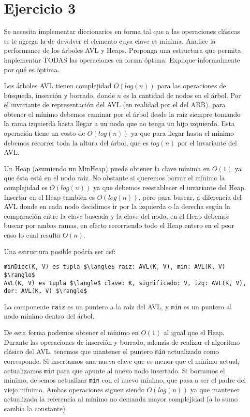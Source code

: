 \section*{Ejercicio 3}

Se necesita implementar diccionarios en forma tal que a las operaciones clásicas se le agrega la de devolver el elemento cuya clave es mínima. Analice la performance de los árboles AVL y Heaps. Proponga una estructura que permita implementar TODAS las operaciones en forma óptima. Explique informalmente por qué es óptima.

Los árboles AVL tienen complejidad $O(log(n))$ para las operaciones de búsqueda, inserción y borrado, donde $n$ es la cantidad de nodos en el árbol. Por el invariante de representación del AVL (en realidad por el del ABB), para obtener el mínimo debemos caminar por el árbol desde la raíz siempre tomando la rama izquierda hasta llegar a un nodo que no tenga un hijo izquierdo. Esta operación tiene un costo de $O(log(n))$ ya que para llegar hasta el mínimo debemos recorrer toda la altura del árbol, que es $log(n)$ por el invariante del AVL.

Un Heap (asumiendo un MinHeap) puede obtener la clave mínima en $O(1)$ ya que ésta está en el nodo raíz. No obstante si queremos borrar el mínimo la complejidad es $O(log(n))$ ya que debemos reestablecer el invariante del Heap. Insertar en el Heap también es $O(log(n))$, pero para buscar, a diferencia del AVL donde en cada nodo decidimos ir por la izquierda o la derecha según la comparación entre la clave buscada y la clave del nodo, en el Heap debemos buscar por ambas ramas, en efecto recorriendo todo el Heap entero en el peor caso lo cual resulta $O(n)$.

Una estructura posible podría ser así:

\begin{lstlisting}
minDicc(K, V) es tupla $\langle$ raiz: AVL(K, V), min: AVL(K, V) $\rangle$
AVL(K, V) es tupla $\langle$ clave: K, significado: V, izq: AVL(K, V), der: AVL(K, V) $\rangle$
\end{lstlisting}

La componente \lstinline{raiz} es un puntero a la raíz del AVL, y \lstinline{min} es un puntero al nodo mínimo dentro del árbol.

De esta forma podemos obtener el mínimo en $O(1)$ al igual que el Heap. Durante las operaciones de inserción y borrado, además de realizar el algoritmo clásico del AVL, tenemos que mantener el puntero \lstinline{min} actualizado como corresponde. Si insertamos una nueva clave que es menor que el mínimo actual, actualizamos \lstinline{min} para que apunte al nuevo nodo insertado. Si borramos el mínimo, debemos actualizar \lstinline{min} con el nuevo mínimo, que pasa a ser el padre del viejo mínimo. Ambas operaciones siguen siendo $O(log(n))$ ya que mantener actualizada la referencia al mínimo no demanda mayor complejidad (a lo sumo cambia la constante).
